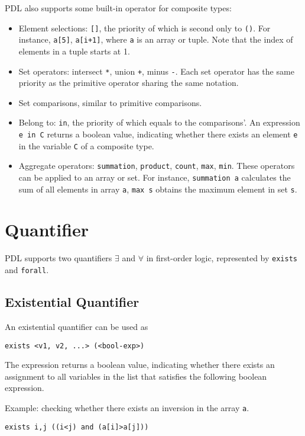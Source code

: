 \documentclass{report}
\begin{document}
PDL also supports some built-in operator for composite types:
\begin{itemize}
    \item Element selections: \texttt{[]}, the priority of which is second only to \texttt{()}. For instance, \texttt{a[5]}, \texttt{a[i+1]}, where \texttt{a} is an array or tuple. Note that the index of elements in a tuple starts at 1.
    \item Set operators: intersect \texttt{*}, union \texttt{+}, minus \texttt{-}. Each set operator has the same priority as the primitive operator sharing the same notation.
    \item Set comparisons, similar to primitive comparisons.
    \item Belong to: \texttt{in}, the priority of which equals to the comparisons'. An expression \texttt{e in C} returns a boolean value, indicating whether there exists an element \texttt{e} in the variable \texttt{C} of a composite type.
    \item Aggregate operators: \texttt{summation}, \texttt{product}, \texttt{count}, \texttt{max}, \texttt{min}. These operators can be applied to an array or set. For instance, \texttt{summation a} calculates the sum of all elements in array \texttt{a}, \texttt{max s} obtains the maximum element in set \texttt{s}.
\end{itemize}

\section{Quantifier}

PDL supports two quantifiers $\exists$ and $\forall$ in first-order logic, represented by \texttt{exists} and \texttt{forall}.

\subsection{Existential Quantifier}

An existential quantifier can be used as
\begin{lstlisting}
exists <v1, v2, ...> (<bool-exp>)
\end{lstlisting}
The expression returns a boolean value, indicating whether there exists an assignment to all variables in the list that satisfies the following boolean expression.

Example: checking whether there exists an inversion in the array \texttt{a}.
\begin{lstlisting}
exists i,j ((i<j) and (a[i]>a[j]))
\end{lstlisting}
\end{document}
